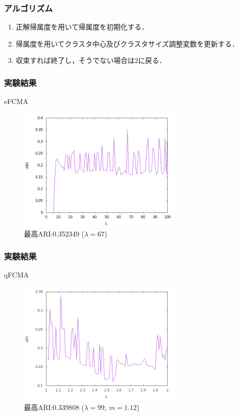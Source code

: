 \documentclass[13pt,dvipdfmx]{beamer}
\begin{document}
\begin{frame}\frametitle{アルゴリズム}
  \begin{enumerate}
  \item 正解帰属度を用いて帰属度を初期化する．
  \item 帰属度を用いてクラスタ中心及びクラスタサイズ調整変数を更新する．
  \item 収束すれば終了し，そうでない場合は$2$に戻る．
  \end{enumerate}
\end{frame}

\begin{frame}\frametitle{実験結果}
  \begin{block}{eFCMA}
    \begin{figure}[htbp]
      \begin{center}
        \includegraphics[height=60mm]{efcma_ARI.png}
      \end{center}
      \captionsetup{labelformat=empty,labelsep=none}
      \caption{最高ARI:0.352349 ($\lambda=67$)}
    \end{figure}
  \end{block}
\end{frame}


\begin{frame}\frametitle{実験結果}
  \begin{block}{qFCMA}
    \begin{figure}[htbp]
      \begin{center}
        \includegraphics[height=60mm]{qfcma_ARI.png}
      \end{center}
      \captionsetup{labelformat=empty,labelsep=none}
      \caption{最高ARI:0.339808 ($\lambda=99$, $m=1.12$)}
    \end{figure}
  \end{block}
\end{frame}
\end{document}
